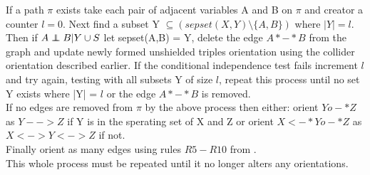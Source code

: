 \documentclass{article}
\newcommand\independent{\protect\mathpalette{\protect\independenT}{\perp}}
\def\independenT#1#2{\mathrel{\rlap{$#1#2$}\mkern2mu{#1#2}}}
\begin{document}
If a path $\pi$ exists take each pair of adjacent variables A and B on $\pi$ and creator a counter $l = 0$. Next find  a subset Y  $\subseteq (sepset(X,Y) \setminus \{A,B\})$ where $|Y| = l$. Then if $A \independent B | Y \cup S$ let sepset(A,B) = Y, delete the edge $A*-*B$ from the graph and update newly formed unshielded triples orientation using the collider orientation described earlier. If the conditional independence test fails increment $l$ and try again, testing with all subsets Y of size $l$, repeat this process until no set Y exists where |Y| = $l$ or the edge $A*-*B$ is removed. 
\\

If no edges are removed from $\pi$ by the above process then either: orient $Yo-*Z$ as $Y-->Z$ if Y is in the sperating set of X and Z or orient $X<-*Yo-*Z$ as $X<->Y<->Z$ if not.
\\

Finally orient as many edges using rules $R5-R10$ from \cite{ZHANG20081873}.
\\

This whole process must be repeated until it no longer alters any orientations.\cite{colombo2012learning}

{}

\end{document}
